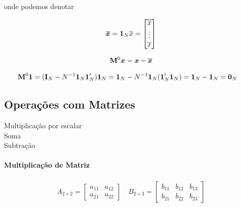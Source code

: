 \documentclass[11pt, oneside, a4paper, article]{article}
\numberwithin{equation}{section}
\begin{document}
\begin{description}
\noindent
onde podemos denotar

\vspace{-1 em}
\begin{align*}
	\overline{\boldsymbol{x}}
	=
	\boldsymbol{1}_{N} \overline{x}
	=
	\begin{bmatrix}
		\overline{\overline{x}} \\ \vdots \\ \overline{x}
	\end{bmatrix}
\end{align*}

\vspace{-1 em}
\begin{align*}
	\mathbf{M}^{0} \boldsymbol{x} 
	= 
	\boldsymbol{x} - \overline{\boldsymbol{x}} 
\end{align*}

\vspace{-1 em}
\begin{align*}
	\mathbf{M}^{0} \boldsymbol{1} &= 
	( \mathbf{I}_{N} - N^{-1} \boldsymbol{1}_{N} \boldsymbol{1}_{N}' ) \boldsymbol{1}_{N}
	= 
	\boldsymbol{1}_{N} - N^{-1} \boldsymbol{1}_{N} (\boldsymbol{1}_{N}' \boldsymbol{1}_{N}) 
	=
	\boldsymbol{1}_{N} - \boldsymbol{1}_{N} 
	=
	\boldsymbol{0}_{N} 
\end{align*}



\subsection{Operações com Matrizes}

\begin{description}
	\item[Multiplicação por escalar] 
	\item[Soma] 
	\item[Subtração] 
\end{description}

\paragraph{Multiplicação de Matriz}

\begin{align*}
	A_{2 \times 2} =
	\begin{bmatrix}
		a_{11} & a_{12} \\
		a_{21} & a_{22}		
	\end{bmatrix}
	\quad
	B_{2 \times 3} =
	\begin{bmatrix}
		b_{11} & b_{12} & b_{13} \\
		b_{21} & b_{22} & b_{23}		
	\end{bmatrix}
\end{align*}


\end{description}
\end{document}
